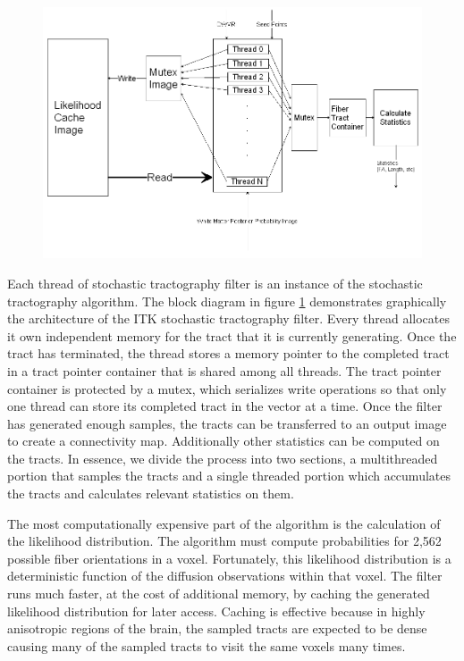 \documentclass{InsightArticle}
\begin{document}
\begin{figure}[t]
  \center
	\includegraphics[width=\linewidth]{filterblock}
	\label{fig:filterblock}
\end{figure}

Each thread of stochastic tractography filter is an instance of the stochastic tractography algorithm. The block diagram in figure \ref{fig:filterblock} demonstrates graphically the architecture of the ITK stochastic tractography filter.  Every thread allocates it own independent memory for the tract that it is currently generating.  Once the tract has terminated, the thread stores a memory pointer to the completed tract in a tract pointer container that is shared among all threads.  The tract pointer container is protected by a mutex, which serializes write operations so that only one thread can store its completed tract in the vector at a time.  Once the filter has generated enough samples, the tracts can be transferred to an output image to create a connectivity map.  Additionally other statistics can be computed on the tracts.  In essence, we divide the process into two sections, a multithreaded portion that samples the tracts and a single threaded portion which accumulates the tracts and calculates relevant statistics on them.

The most computationally expensive part of the algorithm is the calculation of the likelihood distribution.  The algorithm must compute probabilities for 2,562 possible fiber orientations in a voxel.  Fortunately, this likelihood distribution is a deterministic function of the diffusion observations within that voxel.  The filter runs much faster, at the cost of additional memory, by caching the generated likelihood distribution for later access.  Caching is effective because in highly anisotropic regions of the brain, the sampled tracts are expected to be dense causing many of the sampled tracts to visit the same voxels many times.
\end{document}
